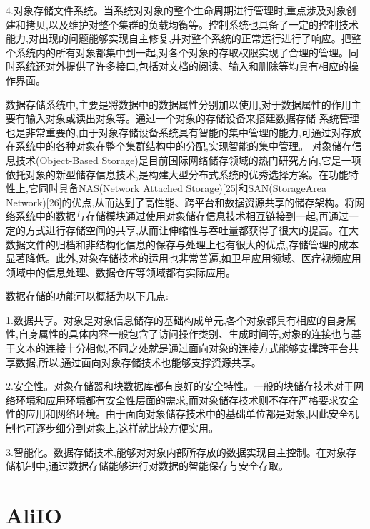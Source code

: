 4.对象存储文件系统。当系统对对象的整个生命周期进行管理时,重点涉及对象创建和拷贝,以及维护对整个集群的负载均衡等。控制系统也具备了一定的控制技术能力,对出现的问题能够实现自主修复,并对整个系统的正常运行进行了响应。把整个系统内的所有对象都集中到一起,对各个对象的存取权限实现了合理的管理。同时系统还对外提供了许多接口,包括对文档的阅读、输入和删除等均具有相应的操作界面。

数据存储系统中,主要是将数据中的数据属性分别加以使用,对于数据属性的作用主要有输入对象或读出对象等。通过一个对象的存储设备来搭建数据存储
系统管理也是非常重要的,由于对象存储设备系统具有智能的集中管理的能力,可通过对存放在系统中的各种对象在整个集群结构中的分配,实现智能的集中管理。
对象储存信息技术(Object-Based Storage)是目前国际网络储存领域的热门研究方向,它是一项依托对象的新型储存信息技术,是构建大型分布式系统的优秀选择方案。在功能特性上,它同时具备NAS(Network Attached Storage)[25]和SAN(StorageArea Network)[26]的优点,从而达到了高性能、跨平台和数据资源共享的储存架构。将网络系统中的数据与存储模块通过使用对象储存信息技术相互链接到一起,再通过一定的方式进行存储空间的共享,从而让伸缩性与吞吐量都获得了很大的提高。在大数据文件的归档和非结构化信息的保存与处理上也有很大的优点,存储管理的成本显著降低。此外,对象存储技术的运用也非常普遍,如卫星应用领域、医疗视频应用领域中的信息处理、数据仓库等领域都有实际应用。

数据存储的功能可以概括为以下几点:

1.数据共享。对象是对象信息储存的基础构成单元,各个对象都具有相应的自身属性,自身属性的具体内容一般包含了访问操作类别、生成时间等,对象的连接也与基于文本的连接十分相似,不同之处就是通过面向对象的连接方式能够支撑跨平台共享数据,所以,通过面向对象存储技术也能够支撑资源共享。

2.安全性。对象存储器和块数据库都有良好的安全特性。一般的块储存技术对于网络环境和应用环境都有安全性层面的需求,而对象储存技术则不存在严格要求安全性的应用和网络环境。由于面向对象储存技术中的基础单位都是对象,因此安全机制也可逐步细分到对象上,这样就比较方便实用。

3.智能化。数据存储技术,能够对对象内部所存放的数据实现自主控制。在对象存储机制中,通过数据存储能够进行对数据的智能保存与安全存取。

\section{AliIO}





